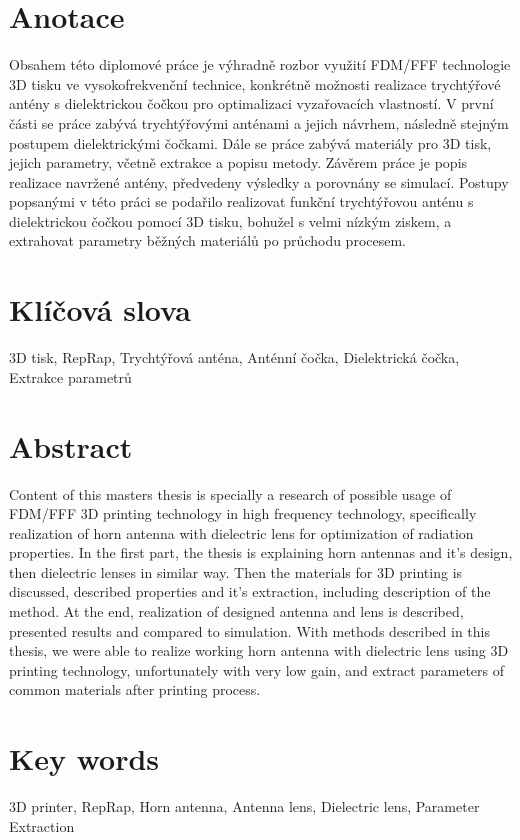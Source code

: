 % 
% 
%

\section*{Anotace}

Obsahem této diplomové práce je výhradně rozbor využití FDM/FFF technologie 3D tisku ve vysokofrekvenční technice, konkrétně možnosti realizace trychtýřové antény s dielektrickou čočkou pro optimalizaci vyzařovacích vlastností. V první části se práce zabývá trychtýřovými anténami a jejich návrhem, následně stejným postupem dielektrickými čočkami. Dále se práce zabývá materiály pro 3D tisk, jejich parametry, včetně extrakce a popisu metody. Závěrem práce je popis realizace navržené antény, předvedeny výsledky a porovnány se simulací.
Postupy popsanými v této práci se podařilo realizovat funkční trychtýřovou anténu s dielektrickou čočkou pomocí 3D tisku, bohužel s velmi nízkým ziskem, a extrahovat parametry běžných materiálů po průchodu procesem.


\section*{Klíčová slova}

3D tisk, RepRap, Trychtýřová anténa, Anténní čočka, Dielektrická čočka, Extrakce parametrů

\section*{Abstract}

Content of this masters thesis is specially a research of possible usage of FDM/FFF 3D printing technology in high frequency technology, specifically realization of horn antenna with dielectric lens for optimization of radiation properties. In the first part, the thesis is explaining horn antennas and it's design, then dielectric lenses in similar way. Then the materials for 3D printing is discussed, described properties and it's extraction, including description of the method. At the end, realization of designed antenna and lens is described, presented results and compared to simulation.
With methods described in this thesis, we were able to realize working horn antenna with dielectric lens using 3D printing technology, unfortunately with very low gain, and extract parameters of common materials after printing process.


\section*{Key words}

3D printer, RepRap, Horn antenna, Antenna lens, Dielectric lens, Parameter Extraction